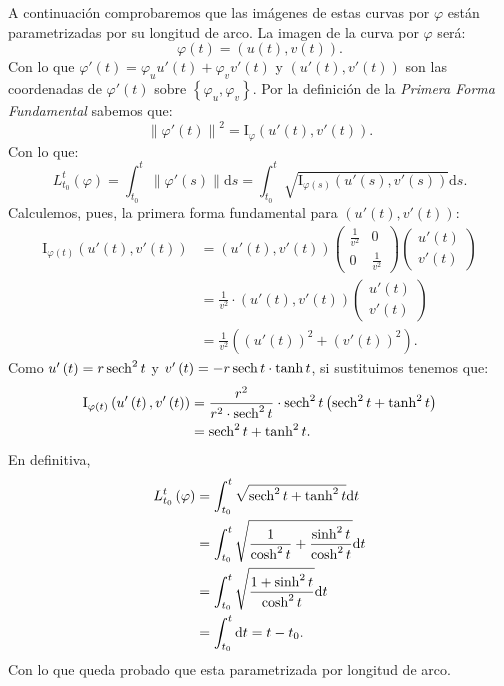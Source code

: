 A continuación comprobaremos que las imágenes de estas curvas por $\varphi$
están parametrizadas por su longitud de arco. La imagen de la curva por
$\varphi$ será:
\[
\varphi\left( t \right) = \left( u\left( t \right), v \left( t \right) \right).
\]
Con lo que $\varphi'\left( t \right) = \varphi_u u'\left( t \right) + \varphi_v
v'\left( t \right)$ y $\left( u'\left( t \right), v'\left( t \right) \right)$
son las coordenadas de $\varphi'\left( t \right)$ sobre $\left\{ \varphi_u,
\varphi_v \right\}$. Por la definición de la \textit{Primera Forma Fundamental}
sabemos que:
\[
\left\lVert \varphi'\left( t \right) \right\rVert^2 = \mathrm{I}_{\varphi}
\left( u'\left( t \right), v'\left( t \right) \right).
\]
Con lo que:
\[
L_{t_0}^t \left( \varphi \right) = \int_{t_0}^{t} \left\lVert \varphi'\left( s
\right) \right\rVert \mathrm{d}s = \int_{t_0}^{t}
\sqrt{\mathrm{I}_{\varphi\left( s \right)} \left( u'\left( s \right), v'\left( s
\right) \right)} \mathrm{d}s.
\]
Calculemos, pues, la primera forma fundamental para $\left( u'\left( t \right),
v'\left( t \right) \right)$:
\begin{align*}
\mathrm{I}_{\varphi\left( t \right)}\left( u'\left( t \right), v'\left( t
\right) \right) &= \left( u'\left( t \right), v'\left( t \right) \right)
\begin{pmatrix} \frac{1}{v^2} & 0\\ 0 & \frac{1}{v^2} \end{pmatrix}
\begin{pmatrix} u'\left( t \right)\\ v'\left( t \right) \end{pmatrix}\\ 
&= \frac{1}{v^2} \cdot \left( u'\left( t \right), v'\left( t \right) \right) \begin{pmatrix} u'\left( t \right)\\ v'\left( t \right) \end{pmatrix}\\
&= \frac{1}{v^2} \left( \left( u'\left( t \right) \right)^2 + \left( v'\left( t
\right) \right)^2 \right).
\end{align*}
Como $u'\left( t \right) = r \operatorname{sech}^2 t$ y $v'\left( t \right) = -r \operatorname{sech} t
\cdot \tanh t$, si sustituimos tenemos que:
\begin{align*}
\mathrm{I}_{\varphi\left( t \right)}\left( u'\left( t \right), v'\left( t
\right) \right) &= \frac{r^2}{r^2 \cdot \operatorname{sech}^2 t} \cdot \operatorname{sech}^2 t \left( \operatorname{sech}^2 t + \tanh^2 t
\right)\\
&= \operatorname{sech}^2 t + \tanh^2 t.
\end{align*}
En definitiva,
\begin{align*}
L_{t_0}^t \left( \varphi \right) &= \int_{t_0}^{t} \sqrt{\operatorname{sech}^2 t + \tanh^2
t} \mathrm{d}t\\
&= \int_{t_0}^{t} \sqrt{\frac{1}{\cosh^2 t} + \frac{\sinh^2 t}{\cosh^2 t}}
\mathrm{d}t\\
&= \int_{t_0}^{t} \sqrt{\frac{1 + \sinh^2 t}{\cosh^2 t}} \mathrm{d}t\\
&= \int_{t_0}^{t}  \mathrm{d}t= t - t_0.
\end{align*}
Con lo que queda probado que esta parametrizada por longitud de arco.

